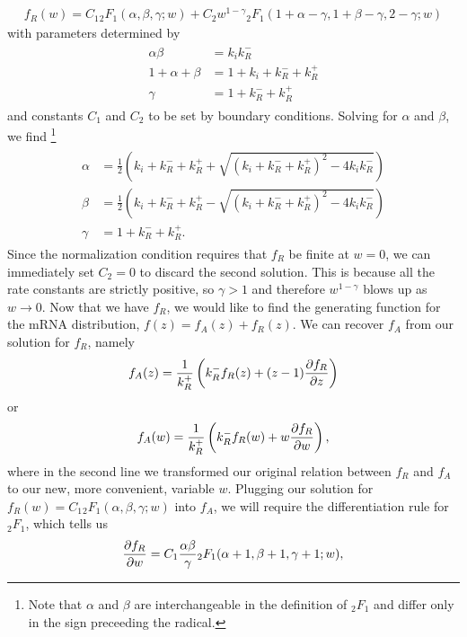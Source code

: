 \begin{align}
f_R(w) = C_1 {_2F_1}(\alpha, \beta, \gamma; w)
+ C_2 w^{1-\gamma}{_2F_1}(1+\alpha-\gamma, 1+\beta-\gamma, 2-\gamma; w)
\end{align}
with parameters determined by
\begin{align}
\begin{split}
\alpha\beta &= k_i k_R^-
\\
1+\alpha+\beta &= 1+k_i+k_R^-+k_R^+
\\
\gamma &= 1 + k_R^- + k_R^+
\end{split}
\end{align}
and constants $C_1$ and $C_2$ to be set by boundary conditions. Solving for
$\alpha$ and $\beta$, we find
\footnote{
Note that $\alpha$ and $\beta$ are interchangeable in the definition of
${_2F_1}$ and differ only in the sign preceeding the radical.
}
\begin{align}
\begin{split}
\alpha &= \frac{1}{2}
\left(k_i+k_R^-+k_R^+ + \sqrt{(k_i+k_R^-+k_R^+)^2 - 4k_i k_R^-}\right)
\\
\beta &= \frac{1}{2}
\left(k_i+k_R^-+k_R^+ - \sqrt{(k_i+k_R^-+k_R^+)^2 - 4k_i k_R^-}\right)
\\
\gamma &= 1 + k_R^- + k_R^+.
\end{split}
\end{align}
Since the normalization condition requires that $f_R$ be finite at $w=0$,
we can immediately set $C_2=0$ to discard the second solution.
This is because all the rate constants are strictly positive,
so $\gamma>1$ and therefore $w^{1-\gamma}$ blows up as $w\rightarrow0$.
Now that we have $f_R$, we would like to find the generating function
for the mRNA distribution, $f(z) = f_A(z) + f_R(z)$.
We can recover $f_A$ from our solution for $f_R$, namely
\begin{align}
f_A(z) = \frac{1}{k_R^+}\left(k_R^- f_R(z) + (z-1) \pderiv[f_R]{z}\right)
\end{align}
or
\begin{align}
f_A(w) = \frac{1}{k_R^+}\left(k_R^- f_R(w) + w \pderiv[f_R]{w}\right),
\end{align}
where in the second line we transformed our original relation between
$f_R$ and $f_A$ to our new, more convenient, variable $w$.
Plugging our solution for $f_R(w) = C_1{_2F_1}(\alpha, \beta, \gamma; w)$
into $f_A$, we will require the differentiation rule for ${_2F_1}$,
which tells us
\begin{align}
\pderiv[f_R]{w} = C_1\frac{\alpha\beta}{\gamma}
                {_2F_1}(\alpha+1, \beta+1, \gamma+1; w),
\end{align}

